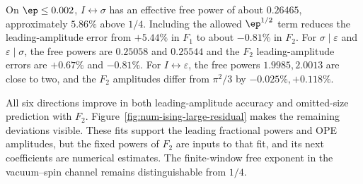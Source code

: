 On $\ep\leq0.002$, $I\leftrightarrow\sigma$ has an effective
free power of about $0.26465$, approximately $5.86\%$ above $1/4$.
Including the allowed $\ep^{1/2}$ term reduces the leading-amplitude
error from $+5.44\%$ in $F_1$ to about $-0.81\%$ in $F_2$.
For $\sigma\mid\varepsilon$ and $\varepsilon\mid\sigma$, the
free powers are $0.25058$ and $0.25544$ and the $F_2$
leading-amplitude errors are $+0.67\%$ and $-0.81\%$.
For $I\leftrightarrow\varepsilon$, the free powers
$1.9985,2.0013$ are close to two, and the $F_2$ amplitudes differ
from $\pi^2/3$ by $-0.025\%,+0.118\%$.

All six directions improve in both leading-amplitude accuracy
and omitted-size prediction with $F_2$.
Figure~\ref{fig:num-ising-large-residual} makes the remaining
deviations visible. These fits support the leading fractional
powers and OPE amplitudes, but the fixed powers of $F_2$ are inputs
to that fit, and its next coefficients are numerical estimates.
The finite-window free exponent in the vacuum--spin channel
remains distinguishable from $1/4$.


\clearpage

